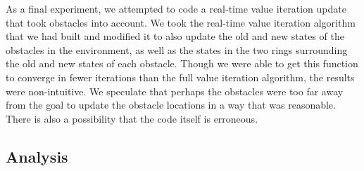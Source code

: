 \documentclass{aiaa-tc}%
\begin{document}
\clearpage
\noindent
As a final experiment, we attempted to code a real-time value iteration update that took obstacles into account. We took the real-time value iteration algorithm that we had built and modified it to also update the old and new states of the obstacles in the environment, as well as the states in the two rings surrounding the old and new states of each obstacle. Though we were able to get this function to converge in fewer iterations than the full value iteration algorithm, the results were non-intuitive. We speculate that perhaps the obstacles were too far away from the goal to update the obstacle locations in a way that was reasonable. There is also a possibility that the code itself is erroneous.
\subsection{Analysis}
\end{document}
